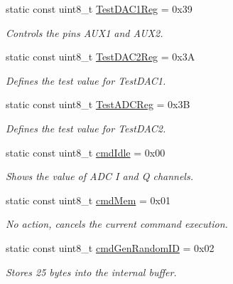\begin{DoxyCompactItemize}
static const uint8\+\_\+t \hyperlink{classMFRC522_a58755b48e8eed115aa5650e8bfb8986f}{Test\+D\+A\+C1\+Reg} = 0x39
\begin{DoxyCompactList}\small\item\em Controls the pins A\+U\+X1 and A\+U\+X2. \end{DoxyCompactList}\item 
\mbox{\label{classMFRC522_aff5ac0eb39afa116dfd2a8a390b91d25}} 
static const uint8\+\_\+t \hyperlink{classMFRC522_aff5ac0eb39afa116dfd2a8a390b91d25}{Test\+D\+A\+C2\+Reg} = 0x3A
\begin{DoxyCompactList}\small\item\em Defines the test value for Test\+D\+A\+C1. \end{DoxyCompactList}\item 
\mbox{\label{classMFRC522_addbdc1d2d79dc48b5dc8b05757c89d82}} 
static const uint8\+\_\+t \hyperlink{classMFRC522_addbdc1d2d79dc48b5dc8b05757c89d82}{Test\+A\+D\+C\+Reg} = 0x3B
\begin{DoxyCompactList}\small\item\em Defines the test value for Test\+D\+A\+C2. \end{DoxyCompactList}\item 
static const uint8\+\_\+t \hyperlink{classMFRC522_aa0a33c3059b58a75fc8c1ff8201601bb}{cmd\+Idle} = 0x00
\begin{DoxyCompactList}\small\item\em Shows the value of A\+DC I and Q channels. \end{DoxyCompactList}\item 
\mbox{\label{classMFRC522_a3a33c02b0ee2699dc7fd1e0d9522e599}} 
static const uint8\+\_\+t \hyperlink{classMFRC522_a3a33c02b0ee2699dc7fd1e0d9522e599}{cmd\+Mem} = 0x01
\begin{DoxyCompactList}\small\item\em No action, cancels the current command execution. \end{DoxyCompactList}\item 
\mbox{\label{classMFRC522_a5db2970d46d7b445af997cf42c036e27}} 
static const uint8\+\_\+t \hyperlink{classMFRC522_a5db2970d46d7b445af997cf42c036e27}{cmd\+Gen\+Random\+ID} = 0x02
\begin{DoxyCompactList}\small\item\em Stores 25 bytes into the internal buffer. \end{DoxyCompactList}\item 

\end{DoxyCompactItemize}
